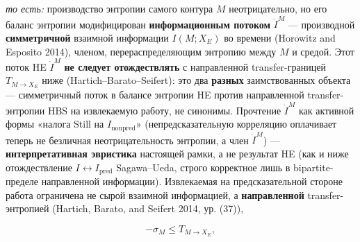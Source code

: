 \documentclass[pdflatex,sn-mathphys-ay]{sn-jnl}
\begin{document}
\emph{то есть:} производство энтропии самого контура \(M\) неотрицательно, но его баланс энтропии модифицирован \textbf{информационным потоком} \(\dot I^{M}\) --- производной \textbf{симметричной} взаимной информации \(I(M; X_E)\) во времени (Horowitz and Esposito 2014), членом, перераспределяющим энтропию между \(M\) и средой. Этот поток HE \(\dot I^{M}\) \textbf{не следует отождествлять} с направленной transfer-границей \(T_{M \to X_E}\) ниже (Hartich--Barato--Seifert): это два \textbf{разных} заимствованных объекта --- симметричный поток в балансе энтропии HE против направленной transfer-энтропии HBS на извлекаемую работу, не синонимы. Прочтение \(\dot I^{M}\) как активной формы «налога Still на \(I_{\text{nonpred}}\)» (непредсказательную корреляцию оплачивает теперь не безличная неотрицательность энтропии, а член \(\dot I^{M}\)) --- \textbf{интерпретативная эвристика} настоящей рамки, а не результат HE (как и ниже отождествление \(I \leftrightarrow I_{\text{pred}}\) Sagawa--Ueda, строго корректное лишь в bipartite-пределе направленной информации). Извлекаемая на предсказательной стороне работа ограничена не сырой взаимной информацией, а \textbf{направленной} transfer-энтропией (Hartich, Barato, and Seifert 2014, ур. (37)),

\[-\sigma_{M} \le T_{M \to X_E},\]
\end{document}
